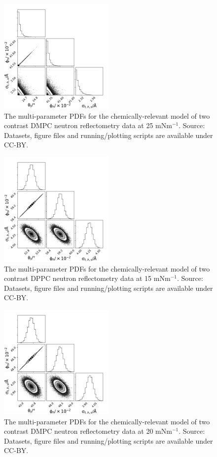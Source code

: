 \documentclass[11pt,a4paper]{article}
\begin{document}
\begin{figure}[h]
	\centering
	\includegraphics[width=0.50\textwidth]{figures/dmpc_25n_all_corner}
	\caption{The multi-parameter PDFs for the chemically-relevant model of two contrast DMPC neutron reflectometry data at 25 mNm$^{-1}$. Source: Datasets, figure files and running/plotting scripts are available under CC-BY.\cite{mccluskey_2018}}
	\label{fig:dmpcn2}
\end{figure}
\begin{figure}[h]
	\centering
	\includegraphics[width=0.50\textwidth]{figures/dppc_15n_all_corner}
	\caption{The multi-parameter PDFs for the chemically-relevant model of two contrast DPPC neutron reflectometry data at 15 mNm$^{-1}$. Source: Datasets, figure files and running/plotting scripts are available under CC-BY.\cite{mccluskey_2018}}
	\label{fig:dppcn1}
\end{figure}
\begin{figure}[h]
	\centering
	\includegraphics[width=0.50\textwidth]{figures/dppc_20n_all_corner}
	\caption{The multi-parameter PDFs for the chemically-relevant model of two contrast DMPC neutron reflectometry data at 20 mNm$^{-1}$. Source: Datasets, figure files and running/plotting scripts are available under CC-BY.\cite{mccluskey_2018}}
	\label{fig:dppcn2}
\end{figure}

\end{document}
